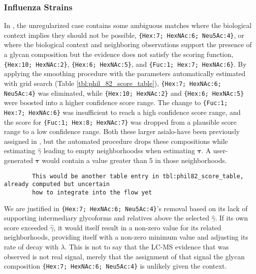     \subsubsection{Influenza Strains}
        In \phil, the unregularized case contains some ambiguous matches where the biological
    context implies they should not be possible, \texttt{\{Hex:7; HexNAc:6; Neu5Ac:4\}}, or
    where the biological context and neighboring observations support the presence of a glycan
    composition but the evidence does not satisfy the scoring function, \texttt{\{Hex:10; HexNAc:2\}},
    \texttt{\{Hex:6; HexNAc:5\}}, and \texttt{\{Fuc:1; Hex:7; HexNAc:6\}}. By applying the smoothing
    procedure with the parameters automatically estimated with grid search (Table \ref{tbl:phil_82_score_table}),
    \texttt{\{Hex:7; HexNAc:6; Neu5Ac:4\}} was eliminated, while \texttt{\{Hex:10; HexNAc:2\}} and
    \texttt{\{Hex:6; HexNAc:5\}} were boosted into a higher confidence score range. The change
    to \texttt{\{Fuc:1; Hex:7; HexNAc:6\}} was insufficient to reach a high confidence score range,
    and the score for \texttt{\{Fuc:1; Hex:8; HexNAc:7\}} was dropped from a plausible score range
    to a low confidence range. Both these larger asialo-\nglycans have been previously assigned
    in \cite{Khatri2016a},  but the automated procedure drops these compositions while estimating
    ${\hat \gamma}$ leading to empty neighborhoodss when estimating $\mathbf{\tau}$. A user-generated
    $\mathbf{\tau}$ would contain a value greater than 5 in those neighborhoods.

    \begin{verbatim}
        This would be another table entry in tbl:phil82_score_table, already computed but uncertain
        how to integrate into the flow yet
    \end{verbatim}

        We are justified in \texttt{\{Hex:7; HexNAc:6; Neu5Ac:4\}}'s removal based on its lack of supporting
    intermediary glycoforms and relatives above the selected $\hat{\gamma}$. If its own score exceeded $\hat{\gamma}$,
    it would itself result in a non-zero value for its related neighborhoods, providing itself with a
    non-zero minimum value and adjusting its rate of decay with $\lambda$. This is not to say that the
    LC-MS evidence that was observed is not real signal, merely that the assignment of that signal the
    glycan composition \texttt{\{Hex:7; HexNAc:6; Neu5Ac:4\}} is unlikely given the context.

